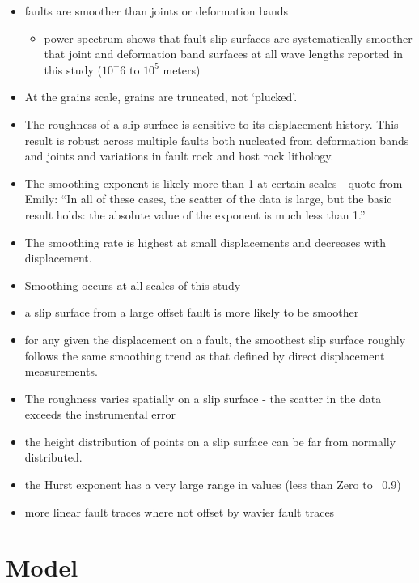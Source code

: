 \documentclass[12pt,a4paper]{article}
\begin{document}
\begin{itemize}
\item faults are smoother than joints or deformation bands
	\begin{itemize}
		\item power spectrum shows that fault slip surfaces are systematically smoother that joint and deformation band surfaces  at all wave lengths reported in this study ($10^-6$ to $10^5$ meters)
	\end{itemize}
\item At the grains scale, grains are truncated, not `plucked'.
\item The roughness of a slip surface is sensitive to its displacement history. This result is robust across multiple faults both nucleated from deformation bands and joints and variations in fault rock and host rock lithology.
\item The smoothing exponent is likely more than 1 at certain scales - quote from Emily: ``In all of these cases, the scatter of the data is large, but the basic result holds: the absolute value of the exponent is much less than 1.''
\item The smoothing rate is highest at small displacements and decreases with displacement.
\item Smoothing occurs at all scales of this study
\item a slip surface from a large offset fault is more likely to be smoother
\item for any given the displacement on a fault, the smoothest slip surface roughly follows the same smoothing trend as that defined by direct displacement measurements. 
\item The roughness varies spatially on a slip surface - the scatter in the data exceeds the instrumental error
\item the height distribution of points on a slip surface can be far from normally distributed.
\item the Hurst exponent has a very large range in values (less than Zero to ~0.9)
\item more linear fault traces where not offset by wavier fault traces

\end{itemize}

\section{Model}
\end{document}
